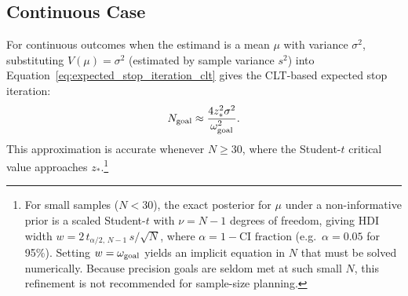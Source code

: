 %


\subsection*{Continuous Case}

For continuous outcomes when the estimand is a mean $\mu$ with variance
$\sigma^{2}$, substituting $V(\mu)=\sigma^{2}$ (estimated by sample variance
$s^{2}$) into Equation~\ref{eq:expected_stop_iteration_clt} gives the
CLT-based expected stop iteration:
\begin{equation}\label{eq:expected_stop_iteration_mean}
N_{\rm goal} \approx \frac{4 z_{*}^{2}\sigma^{2}}{\omega_{\rm goal}^{2}}.
\end{equation}
This approximation is accurate whenever $N \ge 30$, where the Student-$t$
critical value approaches $z_{*}$.\footnote{%
  For small samples ($N < 30$), the exact posterior for $\mu$ under a
  non-informative prior is a scaled Student-$t$ with $\nu = N-1$ degrees
  of freedom, giving HDI width $w = 2\,t_{\alpha/2,\,N-1}\,s/\!\sqrt{N}$,
  where $\alpha = 1 - \text{CI fraction}$ (e.g.\ $\alpha = 0.05$ for
  95\%).  Setting $w = \omega_{\rm goal}$ yields an implicit equation in
  $N$ that must be solved numerically.  Because precision goals are seldom
  met at such small $N$, this refinement is not recommended for
  sample-size planning.}

